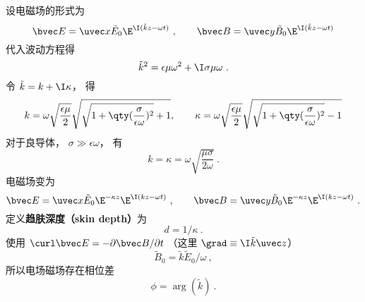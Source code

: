 设电磁场的形式为
\begin{equation}
\bvec E = \uvec x \tilde E_0 \E^{\I (\tilde k z - \omega t)}~,
\qquad
\bvec B = \uvec y \tilde B_0 \E^{\I (\tilde k z - \omega t)}
\end{equation}
代入波动方程得
\begin{equation}
\tilde k^2 = \epsilon\mu \omega^2 + \I \sigma \mu \omega~.
\end{equation}
令 $\tilde k = k + \I \kappa$， 得
\begin{equation}
k = \omega\sqrt{\frac{\epsilon\mu}{2}} \sqrt{\sqrt{1 + \qty(\frac{\sigma}{\epsilon\omega})^2} + 1},
\qquad
\kappa = \omega\sqrt{\frac{\epsilon\mu}{2}} \sqrt{\sqrt{1 + \qty(\frac{\sigma}{\epsilon\omega})^2} - 1}
\end{equation}
对于良导体， $\sigma \gg \epsilon\omega$， 有
\begin{equation}
k = \kappa = \omega \sqrt{\frac{\mu\sigma}{2\omega}}~.
\end{equation}
电磁场变为
\begin{equation}
\bvec E = \uvec x \tilde E_0 \E^{-\kappa z} \E^{\I (kz - \omega t)}~,
\qquad
\bvec B = \uvec y \tilde B_0 \E^{-\kappa z} \E^{\I (kz - \omega t)}~.
\end{equation}
定义\textbf{趋肤深度（skin depth）}为
\begin{equation}
d = 1/\kappa~.
\end{equation}
使用 $\curl \bvec E = -\partial \bvec B / \partial t$ （这里 $\grad \equiv \I \tilde k \uvec z$）
\begin{equation}
\tilde B_0 = \tilde k \tilde E_0 / \omega~,
\end{equation}
所以电场磁场存在相位差
\begin{equation}
\phi = \arg (\tilde k)~.
\end{equation}
